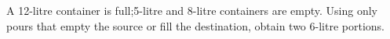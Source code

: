 A 12-litre container is full;5-litre and 8-litre containers are empty. Using only pours that empty the source or fill the destination, obtain two 6-litre portions.
